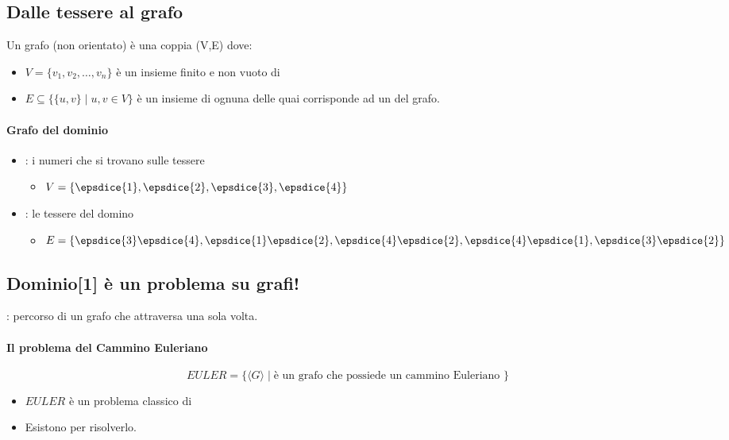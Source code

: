 \subsection{Dalle tessere al grafo}
\begin{definition}
  Un grafo (non orientato) è una coppia (V,E) dove:
 \begin{itemize}
   \item $V = \{v_1, v_2,\dots,v_n\}$ è un insieme finito e non vuoto di 
   \item $E\subseteq\big\{\{u,v\}\mid u,v\in V\big\}$ è un insieme di 
     ognuna delle quai corrisponde ad un  del grafo.
 \end{itemize} 
\end{definition}
\paragraph{Grafo del dominio}
\begin{itemize}
  \item {}: i numeri che si trovano sulle tessere
    \begin{itemize}
      \item $V = \{\epsdice{1},\epsdice{2},\epsdice{3},\epsdice{4}\}$
    \end{itemize}
  \item {}: le tessere del domino
    \begin{itemize}
      \item $E =  \{\epsdice{3}\epsdice{4}, \epsdice{1}\epsdice{2},
        \epsdice{4} \epsdice{2},\epsdice{4} \epsdice{1}, 
                   \epsdice{3} \epsdice{2} \}$
    \end{itemize}
\end{itemize}
\subsection{Dominio[1] è un problema su grafi!}
: percorso di un grafo che attraversa 
una sola volta.
\paragraph{Il problema del Cammino Euleriano}
\[
  EULER = \{\langle G\rangle\mid \textrm{
    è un grafo che possiede un cammino Euleriano
  }\}
\]
\begin{itemize}
  \item $EULER$ è un problema classico di 
  \item Esistono  per risolverlo.
\end{itemize}
